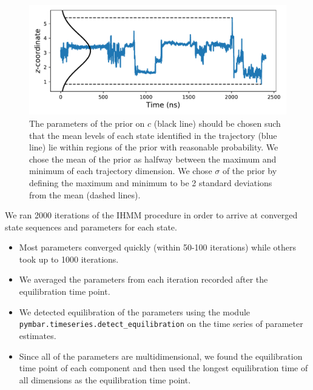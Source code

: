 \documentclass{article}
\begin{document}
  \begin{figure}
  \centering
  \includegraphics[width=\textwidth]{prior_guesses.pdf}
  \caption{The parameters of the prior on $c$ (black line) should be chosen such
  that the mean levels of each state identified in the trajectory (blue line) lie within
  regions of the prior with reasonable probability. We chose the mean of the prior 
  as halfway between the maximum and minimum of each trajectory dimension. We chose 
  $\sigma$ of the prior by defining the maximum and minimum to be 2 standard deviations
  from the mean (dashed lines).}\label{fig:prior_guesses}
  \end{figure}
  
  We ran 2000 iterations of the IHMM procedure in order to arrive at converged 
  state sequences and parameters for each state.
  \begin{itemize}  
    \item Most parameters converged quickly (within 50-100 iterations) while
    others took up to 1000 iterations.
    \item We averaged the parameters from each iteration recorded after the
    equilibration time point.
    \item We detected equilibration of the parameters using the module 
    \texttt{pymbar.timeseries.detect\_equilibration} on the time series of 
    parameter estimates. 
    \item Since all of the parameters are multidimensional, we found the 
    equilibration time point of each component and then used the longest
    equilibration time of all dimensions as the equilibration time point.
  \end{itemize}
  
\end{document}
